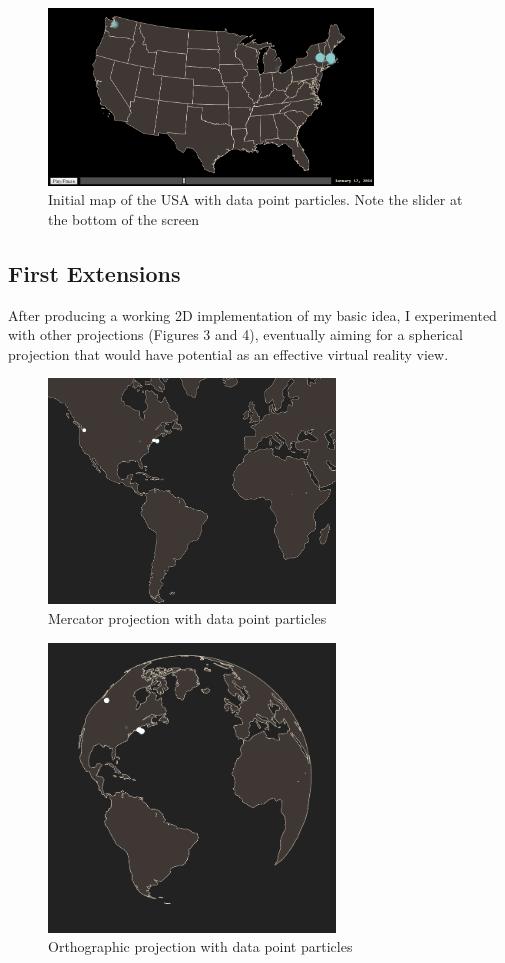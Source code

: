 \documentclass[conference]{acmsiggraph}
\begin{document}
\begin{figure}
  \centering
  \includegraphics[width=3.4in]{images/initial_us_map}
  \caption{Initial map of the USA with data point particles. Note the slider at
           the bottom of the screen}
\end{figure}

\subsection{First Extensions}

After producing a working 2D implementation of my basic idea, I experimented
with other projections (Figures 3 and 4), eventually aiming for a spherical
projection that would have potential as an effective virtual reality view.

\begin{figure}
  \centering
  \includegraphics[width=3.0in]{images/mercator_projection_with_particles}
  \caption{Mercator projection with data point particles}
\end{figure}

\begin{figure}
  \centering
  \includegraphics[width=3.0in]{images/orthographic_projection_with_particles}
  \caption{Orthographic projection with data point particles}
\end{figure}
\end{document}
